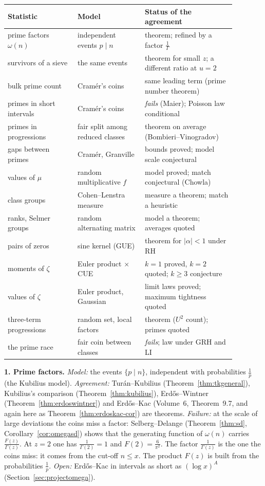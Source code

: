 \begin{center}
\small
\begin{tabular}{p{0.27\linewidth}p{0.26\linewidth}p{0.35\linewidth}}
\textbf{Statistic} & \textbf{Model} & \textbf{Status of the agreement}\\\hline
prime factors $\omega(n)$ & independent events $p\mid n$ & theorem; refined by a factor $\frac1{\Gamma}$\\
survivors of a sieve & the same events & theorem for small $z$; a different ratio at $u=2$\\
bulk prime count & Cram\'er's coins & same leading term (prime number theorem)\\
primes in short intervals & Cram\'er's coins & \emph{fails} (Maier); Poisson law conditional\\
primes in progressions & fair split among reduced classes & theorem on average (Bombieri--Vinogradov)\\
gaps between primes & Cram\'er, Granville & bounds proved; model scale conjectural\\
values of $\mu$ & random multiplicative $f$ & model proved; match conjectural (Chowla)\\
class groups & Cohen--Lenstra measure & measure a theorem; match a heuristic\\
ranks, Selmer groups & random alternating matrix & model a theorem; averages quoted\\
pairs of zeros & sine kernel (GUE) & theorem for $|\alpha|<1$ under RH\\
moments of $\zeta$ & Euler product $\times$ CUE & $k=1$ proved, $k=2$ quoted; $k\ge3$ conjecture\\
values of $\zeta$ & Euler product, Gaussian & limit laws proved; maximum tightness quoted\\
three-term progressions & random set, local factors & theorem ($U^2$ count); primes quoted\\
the prime race & fair coin between classes & \emph{fails}; law under GRH and LI
\end{tabular}
\end{center}

\medskip\noindent\textbf{1. Prime factors.} \emph{Model:} the events $\{p\mid n\}$, independent with probabilities $\frac1p$ (the Kubilius model). \emph{Agreement:} Tur\'an--Kubilius (Theorem~\ref{thm:tkgeneral}), Kubilius's comparison (Theorem~\ref{thm:kubilius}), Erd\H{o}s--Wintner (Theorem~\ref{thm:erdoswintner}) and Erd\H{o}s--Kac (Volume~6, Theorem~9.7, and again here as Theorem~\ref{thm:erdoskac-cor}) are theorems. \emph{Failure:} at the scale of large deviations the coins miss a factor: Selberg--Delange (Theorem~\ref{thm:sd}, Corollary~\ref{cor:omegasd}) shows that the generating function of $\omega(n)$ carries $\frac{F(z)}{\Gamma(z)}$. At $z=2$ one has $\frac1{\Gamma(2)}=1$ and $F(2)=\frac6{\pi^2}$. The factor $\frac1{\Gamma(z)}$ is the one the coins miss: it comes from the cut-off $n\le x$. The product $F(z)$ is built from the probabilities $\frac1p$. \emph{Open:} Erd\H{o}s--Kac in intervals as short as $(\log x)^A$ (Section~\ref{sec:projectomega}).

